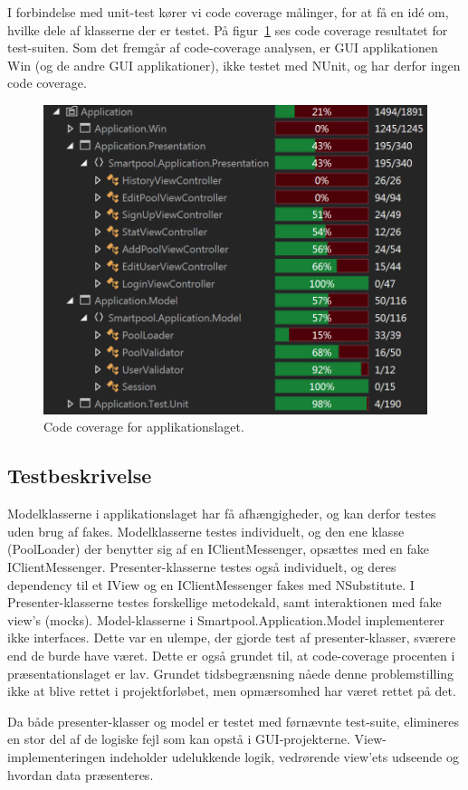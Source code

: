 I forbindelse med unit-test kører vi code coverage målinger, for at få en idé om, hvilke dele af klasserne der er testet. På figur~\ref{fig:appcoverage} ses code coverage resultatet for test-suiten. Som det fremgår af code-coverage analysen, er GUI applikationen Win (og de andre GUI applikationer), ikke testet med NUnit, og har derfor ingen code coverage.

\begin{figure}
\centering
\includegraphics[width=0.9\linewidth]{figs/test/appcoverage}
\caption{Code coverage for applikationslaget.}
\label{fig:appcoverage}
\end{figure}

\subsection{Testbeskrivelse}
Modelklasserne i applikationslaget har få afhængigheder, og kan derfor testes uden brug af fakes. Modelklasserne testes individuelt, og den ene klasse (PoolLoader) der benytter sig af en IClientMessenger, opsættes med en fake IClientMessenger. Presenter-klasserne testes også individuelt, og deres dependency til et IView og en IClientMessenger fakes med NSubstitute. I Presenter-klasserne testes forskellige metodekald, samt interaktionen med fake view’s (mocks). Model-klasserne i Smartpool.Application.Model implementerer ikke interfaces. Dette var en ulempe, der gjorde test af presenter-klasser, sværere end de burde have været. Dette er også grundet til, at code-coverage procenten i præsentationslaget er lav. Grundet tidsbegrænsning nåede denne problemstilling ikke at blive rettet i projektforløbet, men opmærsomhed har været rettet på det.

Da både presenter-klasser og model er testet med førnævnte test-suite, elimineres en stor del af de logiske fejl som kan opstå i GUI-projekterne. View-implementeringen indeholder udelukkende logik, vedrørende view’ets udseende og hvordan data præsenteres.
